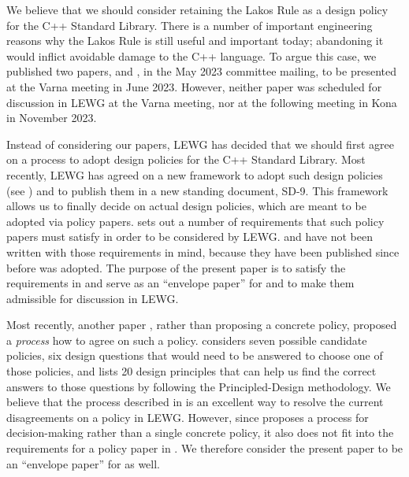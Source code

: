 We believe that we should consider retaining the Lakos Rule as a design policy for the C++ Standard Library. There is a number of important engineering reasons why the Lakos Rule is still useful and important today; abandoning it would inflict avoidable damage to the C++ language. To argue this case, we published two papers, \cite{P2831R0} and \cite{P2861R0}, in the May 2023 committee mailing, to be presented at the Varna meeting in June 2023. However, neither paper was scheduled for discussion in LEWG at the Varna meeting, nor at the following meeting in Kona in November 2023.

Instead of considering our papers, LEWG has decided that we should first agree on a process to adopt design policies for the C++ Standard Library. Most recently, LEWG has agreed on a new framework to adopt such design policies (see \cite{P2267R1}) and to publish them in a new standing document, SD-9. This framework allows us to finally decide on actual design policies, which are meant to be adopted via policy papers. \cite{P2267R1} sets out a number of requirements that such policy papers must satisfy in order to be considered by LEWG. \cite{P2831R0} and \cite{P2861R0} have not been written with those requirements in mind, because they have been published since before \cite{P2267R1} was adopted. The purpose of the present paper is to satisfy the requirements in \cite{P2267R1} and serve as an ``envelope paper'' for \cite{P2831R0} and \cite{P2861R0} to make them admissible for discussion in LEWG.

Most recently, another paper \cite{P3005R0}, rather than proposing a concrete  policy, proposed a \emph{process} how to agree on such a policy. \cite{P3005R0} considers seven possible candidate  policies, six design questions that would need to be answered to choose one of those policies, and lists 20 design principles that can help us find the correct answers to those questions by following the Principled-Design methodology. We believe that the process described in \cite{P3005R0} is an excellent way to resolve the current disagreements on a  policy in LEWG. However, since \cite{P3005R0} proposes a process for decision-making rather than a single concrete policy, it also does not fit into the requirements for a policy paper in \cite{P2267R1}. We therefore consider the present paper to be an ``envelope paper'' for  \cite{P3005R0} as well.



